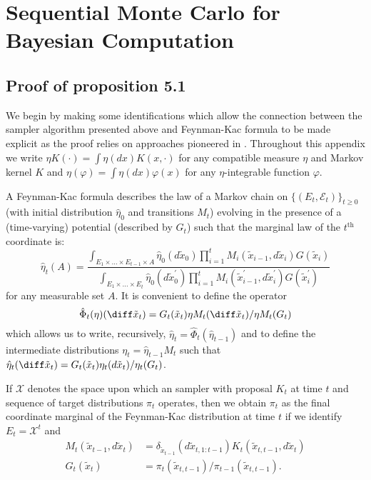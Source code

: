 \chapter{Sequential Monte Carlo for Bayesian Computation}
\label{cha:Appendix Sequential Monte Carlo for Bayesian Computation}

\section{Proof of proposition 5.1}
\label{sec:Proof of proposition 5.1}

We begin by making some identifications which allow the connection between the
\smc sampler algorithm presented above and Feynman-Kac formula to be made
explicit as the proof relies on approaches pioneered in
\cite{DelMoral:2004ux}. Throughout this appendix we write $\eta K(\cdot) =
\int \eta(dx) K(x,\cdot)$ for any compatible measure $\eta$ and Markov kernel
$K$ and $\eta(\varphi) = \int \eta(dx) \varphi(x)$ for any $\eta$-integrable
function $\varphi$.

A Feynman-Kac formula describes the law of a Markov chain on
$\{(E_t,\mathcal{E}_t)\}_{t\geq 0}$ (with initial distribution $\hat\eta_0$
and transitions $M_t$) evolving in the presence of a (time-varying) potential
(described by $G_t$) such that the marginal law of the $t^\text{th}$
coordinate is:
\begin{equation*}
  \hat\eta_t(A) = \frac
  {
    \int_{E_1 \times \ldots \times E_{t-1} \times A}
    \hat\eta_0(d\tilde{x}_0)
    \prod_{i=1}^t M_{i}(\tilde{x}_{i-1},d\tilde{x}_i)
    G(\tilde{x}_i)
  }{
    \int_{E_1 \times \ldots \times E_{t}}
    \hat\eta_0(d\tilde{x}^\prime_0)
    \prod_{i=1}^t M_{i}(\tilde{x}^\prime_{i-1},d\tilde{x}^\prime_i)
    G(\tilde{x}^\prime_i)
  }
\end{equation*}
for any measurable set $A$. It is convenient to define the operator 
\begin{equation*}
  \hat\Phi_t(\eta)(\diff\tilde{x}_t)
  = G_t(\tilde{x}_t)\eta M_t(\diff \tilde{x}_t)/\eta M_t(G_t)
\end{equation*}
which allows us to write, recursively, $\hat\eta_t =
\hat\Phi_t(\hat\eta_{t-1})$ and to define the intermediate
distributions $\eta_t = \hat\eta_{t-1}M_t$ such that $\hat\eta_t(\diff
\tilde{x}_t) = G_t(\tilde{x}_t) \eta_t(d\tilde{x}_t) /
\eta_t(G_t)$.

If $\mathcal{X}$ denotes the space upon which an \smc sampler with \mcmc
proposal $K_t$ at time $t$ and sequence of target distributions $\pi_t$
operates, then we obtain $\pi_t$ as the final coordinate marginal of the
Feynman-Kac distribution at time $t$ if we identify $E_t = \mathcal{X}^t$ and
\begin{align*}
  M_{t}(\tilde{x}_{t-1},d\tilde{x}_t) &=
  \delta_{\tilde{x}_{t-1}}(d\tilde{x}_{t,1:t-1})
  K_t(\tilde{x}_{t,t-1},d\tilde{x}_t)\\
  G_t(\tilde{x}_t) &=
  \pi_{t}(\tilde{x}_{t,t-1}) / \pi_{t-1}(\tilde{x}_{t,t-1}).
\end{align*}

